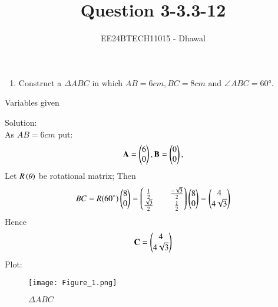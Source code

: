 \documentclass[journal]{IEEEtran}
\numberwithin{equation}{enumi}
\numberwithin{figure}{enumi}
\begin{document}

\title{Question 3-3.3-12}
\author{EE24BTECH11015 - Dhawal}
{\let\newpage\relax\maketitle}
\begin{enumerate}
\item Construct a $\Delta ABC$ in which $AB=6cm,BC=8cm\text{ and } \angle{ABC}=\ang{60}$.

\end{enumerate}

\begin{table}[h!]    
  \centering
  
  \caption{Variables given}
  \label{tab 1.4.9.2}
\end{table}

Solution:\\
As $AB=6cm$ put:
\begin{align}
       \mathbf{A}=\begin{pmatrix}6\\0\end{pmatrix}, \mathbf{B}=\begin{pmatrix}0\\0\end{pmatrix},
\end{align}
Let $R \left(\theta\right)$ be rotational matrix;
Then
\begin{align}
	BC=R(\ang{60})\begin{pmatrix}8\\0\end{pmatrix}=\begin{pmatrix}\frac{1}{2}&&\frac{-\sqrt{3}}{2}\\\frac{\sqrt{3}}{2}&&\frac{1}{2}\end{pmatrix}\begin{pmatrix}8\\0\end{pmatrix}=\begin{pmatrix}4\\4\sqrt{3}\end{pmatrix}
\end{align}
Hence
\begin{align}
	\mathbf{C}=\begin{pmatrix}4\\4\sqrt{3}\end{pmatrix}
\end{align}
Plot:
\begin{figure}[h!]
   \centering
   \texttt{[image: Figure\_1.png]}
	\caption{$\Delta ABC$ }
   \label{stemplot}
\end{figure}
\end{document}
